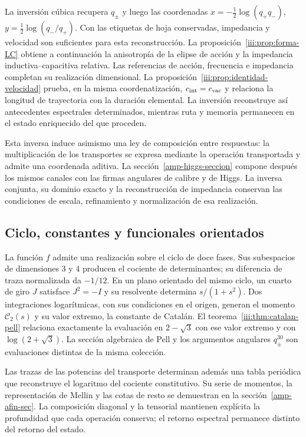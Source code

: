 La inversión cúbica recupera $q_\pm$ y luego las coordenadas
$x=-\frac12\log(q_+q_-)$,
$y=\frac12\log(q_-/q_+)$. Con las etiquetas de hoja conservadas,
impedancia y velocidad son suficientes para esta reconstrucción.
La proposición~\ref{iii:prop:forma-LC} obtiene a continuación la
anisotropía de la elipse de acción y la impedancia inductiva--capacitiva
relativa. Las referencias de acción, frecuencia e impedancia completan
su realización dimensional. La proposición~\ref{iii:prop:identidad-velocidad}
prueba, en la misma coordenatización, $c_{\rm int}=c_{\rm vac}$ y relaciona la
longitud de trayectoria con la duración elemental. La inversión
reconstruye así antecedentes espectrales determinados, mientras ruta
y memoria permanecen en el estado enriquecido del que proceden.

Esta inversa induce asimismo una ley de composición entre respuestas:
la multiplicación de los transportes se expresa mediante la operación
transportada y admite una coordenada aditiva. La
sección~\ref{amp-higgs-seccion} compone después los mismos canales con
las firmas angulares de calibre y de Higgs. La inversa conjunta, su
dominio exacto y la reconstrucción de impedancia conservan las condiciones
de escala, refinamiento y normalización de esa realización.

\subsection{Ciclo, constantes y funcionales orientados}

La función $f$ admite una realización sobre el ciclo de doce fases.
Sus subespacios de dimensiones $3$ y $4$ producen el cociente de
determinantes; su diferencia de traza normalizada da $-1/12$.
En un plano orientado del mismo ciclo, un cuarto de giro $J$ satisface
$J^2=-I$ y su resolvente determina $s/(1+s^2)$. Dos integraciones
logarítmicas, con sus condiciones en el origen, generan el momento
$\mathcal C_2(s)$ y su valor extremo, la constante de Catalán.
El teorema~\ref{iii:thm:catalan-pell} relaciona exactamente la
evaluación en $2-\sqrt3$ con ese valor extremo y con
$\log(2+\sqrt3)$. La sección algebraica de Pell y los argumentos
angulares $q_\pm^{30}$ son evaluaciones distintas de la misma colección.

Las trazas de las potencias del transporte determinan además una tabla
periódica que reconstruye el logaritmo del cociente constitutivo.
Su serie de momentos, la representación de Mellin y las cotas de resto
se demuestran en la sección~\ref{amp-afin-sec}. La composición diagonal
y la tensorial mantienen explícita la profundidad que cada operación
conserva; el retorno espectral permanece distinto del retorno del estado.

